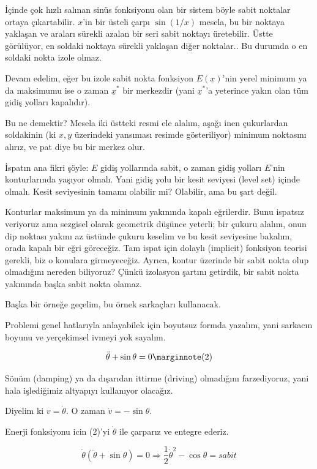 \documentclass[12pt,fleqn]{article}\usepackage{../../common}
\begin{document}
İçinde çok hızlı salınan sinüs fonksiyonu olan bir sistem böyle sabit noktalar
ortaya çıkartabilir. $x$'in bir üsteli çarpı $\sin(1/x)$ mesela, bu bir noktaya
yaklaşan ve araları sürekli azalan bir seri sabit noktayı üretebilir. Üstte
görülüyor, en soldaki noktaya sürekli yaklaşan diğer noktalar.. Bu durumda o en
soldaki nokta izole olmaz.

Devam edelim, eğer bu izole sabit nokta fonksiyon $E(\underline{x})$'nin yerel
minimum ya da maksimumu ise o zaman $\underline{x}^\ast$ bir merkezdir (yani
$\underline{x}^\ast$'a yeterince yakın olan tüm gidiş yolları kapalıdır). 

Bu ne demektir? Mesela iki üstteki resmi ele alalım, aşağı inen çukurlardan
soldakinin (ki $x,y$ üzerindeki yansıması resimde gösteriliyor) minimum
noktasını alırız, ve pat diye bu bir merkez olur.

İspatın ana fikri şöyle: $E$ gidiş yollarında sabit, o zaman gidiş yolları
$E$'nin konturlarında yaşıyor olmalı. Yani gidiş yolu bir kesit seviyesi (level
set) içinde olmalı. Kesit seviyesinin tamamı olabilir mi? Olabilir, ama bu şart
değil.

Konturlar maksimum ya da minimum yakınında kapalı eğrilerdir. Bunu ispatsız
veriyoruz ama sezgisel olarak geometrik düşünce yeterli; bir çukuru alalım, onun
dip noktası yakını az üstünde çukuru keselim ve bu kesit seviyesine bakalım,
orada kapalı bir eğri göreceğiz. Tam ispat için dolaylı (implicit) fonksiyon
teorisi gerekli, biz o konulara girmeyeceğiz. Ayrıca, kontur üzerinde bir sabit
nokta olup olmadığını nereden biliyoruz? Çünkü izolasyon şartını getirdik, bir
sabit nokta yakınında başka sabit nokta olamaz. 

Başka bir örneğe geçelim, bu örnek sarkaçları kullanacak.

Problemi genel hatlarıyla anlayabilek için boyutsuz formda yazalım, yani
sarkacın boyunu ve yerçekimsel ivmeyi yok sayalım.

$$ \ddot{\theta} + \sin\theta = 0 
\mlabel{2} $$

Sönüm (damping) ya da dışarıdan ittirme (driving) olmadığını farzediyoruz, yani
hala işlediğimiz altyapıyı kullanıyor olacağız.

Diyelim ki $v = \dot{\theta}$. O zaman $\dot{v} = -\sin\theta$. 

Enerji fonksiyonu icin (2)'yi $\dot{\theta}$ ile çarparız ve entegre ederiz. 

$$ \dot{\theta}(\ddot{\theta} + \sin\theta) = 0 \Rightarrow
\frac{1}{2} \dot{\theta}^2 - \cos\theta = sabit
$$
\end{document}
